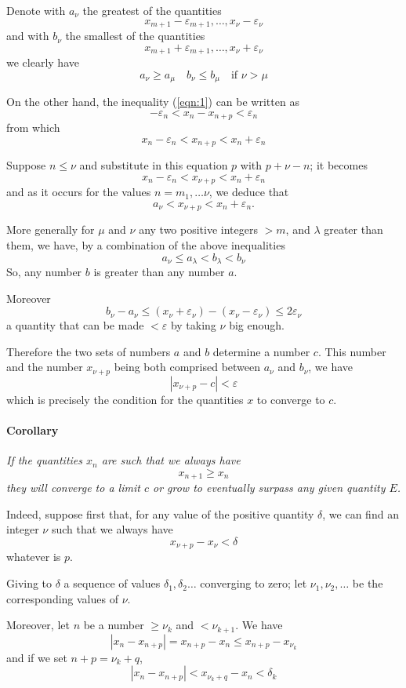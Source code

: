 \documentclass[10pt,letterpaper]{book}
\renewcommand\epsilon{\varepsilon}
\theoremstyle{definition}
\begin{document}
Denote with $a_\nu$ the greatest of the quantities
\[
  x_{m+1}-\epsilon_{m+1},\dots,x_\nu-\epsilon_\nu
\]
and with $b_\nu$ the smallest of the quantities
\[
  x_{m+1}+\epsilon_{m+1},\dots,x_\nu+\epsilon_\nu
\]
we clearly have
\[
  a_\nu\geq a_\mu\quad b_\nu\leq b_\mu\quad\mbox{if }\nu>\mu
\]

On the other hand, the inequality (\ref{eqn:1}) can be written as
\[
  -\epsilon_n<x_n-x_{n+p}<\epsilon_n
\]
from which
\[
  x_n-\epsilon_n<x_{n+p}<x_n+\epsilon_n
\]

Suppose $n\leq\nu$ and substitute in this equation $p$ with $p+\nu-n$; it becomes
\[
  x_n-\epsilon_n<x_{\nu+p}<x_n+\epsilon_n
\]
and as it occurs for the values $n=m_1,\dots\nu$, we deduce that
\[
  a_\nu<x_{\nu+p}<x_n+\epsilon_n.
\]

More generally for $\mu$ and $\nu$ any two positive integers $>m$, and $\lambda$ greater than them, we have, by a combination of the above inequalities
\[
  a_\nu\leq a_\lambda < b_\lambda < b_\nu
\]
So, any number $b$ is greater than any number $a$.

Moreover
\[
  b_\nu-a_\nu\leq(x_\nu+\epsilon_\nu) - (x_\nu-\epsilon_\nu)\leq 2\epsilon_\nu
\]
a quantity that can be made $<\epsilon$ by taking $\nu$ big enough.

Therefore the two sets of numbers $a$ and $b$ determine a number $c$. This number and the number $x_{\nu+p}$ being both comprised between $a_\nu$ and $b_\nu$, we have
\[
  |x_{\nu+p}-c|<\epsilon
\]
which is precisely the condition for the quantities $x$ to converge to $c$.

\paragraph{Corollary} \textit{
If the quantities $x_n$ are such that we always have
\[
  x_{n+1}\geq x_n
\]
they will converge to a limit $c$ or grow to eventually surpass any given quantity $E$.
}

Indeed, suppose first that, for any value
of the positive quantity $\delta$, we can find an integer $\nu$ such that we always have
\[
  x_{\nu+p}-x_\nu < \delta
\]
whatever is $p$.

Giving to $\delta$ a sequence of values $\delta_1,\delta_2\dots$ converging to zero; let $\nu_1,\nu_2,\dots$ be the corresponding values of $\nu$.

Moreover, let $n$ be a number $\geq\nu_k$ and $<\nu_{k+1}$. We have
\[
  |x_{n}-x_{n+p}|=x_{n+p} - x_n \leq x_{n+p} - x_{\nu_k}
\]
and if we set $n+p=\nu_k + q$,
\[
  |x_{n}-x_{n+p}|<x_{\nu_k + q} - x_n < \delta_k
\]
\end{document}
